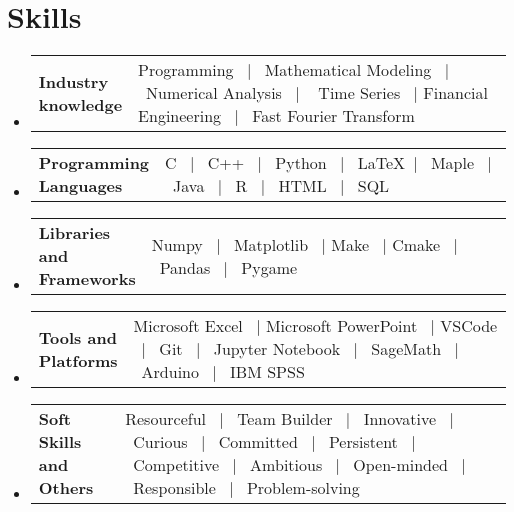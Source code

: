 \documentclass[a4paper,11pt,dvipsnames]{article}
\makeatletter
\newcommand{\resumeSectionTypeOne}[2]{
	\item\begin{tabular*}{0.99\textwidth}[t]{
			p{0.18\linewidth}p{0.81\linewidth}
		}
		\textbf{#1} & #2
	\end{tabular*}\vspace{-2pt}
}
\newcommand{\resumeQuadHeading}[4]{
	\item
	\begin{tabular*}{0.96\textwidth}[t]{l@{\extracolsep{\fill}}r}
		\textbf{#1} & \small #2 \\
		\small#3 & \small #4 \\
	\end{tabular*}
}
\newcommand{\resumeHeadingListStart}{
	\begin{itemize}[leftmargin=0.15in, label={}]
	}
\newcommand{\resumeHeadingListEnd}{\end{itemize}}
\makeatother
\begin{document}
	
	
	
	
	
	\section{Skills}
	\resumeHeadingListStart{}
	\resumeSectionTypeOne{Industry\hspace{1cm} knowledge}{Programming \ $|$ \ Mathematical Modeling \ $|$ \ Numerical Analysis \ $|$ \ \hspace{2cm} Time Series \ $|$ Financial Engineering \ $|$ \ Fast Fourier Transform}
	\resumeHeadingListEnd{}
	
	\resumeHeadingListStart{}
	\resumeSectionTypeOne{Programming Languages}{C \ $|$ \ C++ \ $|$ \ Python \ $|$ \ \LaTeX \ $|$ \ Maple \ $|$ \ Java \ $|$ \ R \ $|$ \ HTML \ $|$ \ SQL}
	\resumeHeadingListEnd{}
	
	\resumeHeadingListStart{}
	\resumeSectionTypeOne{Libraries and Frameworks}{Numpy \ $|$ \ Matplotlib \ $|$ Make \ $|$ Cmake \ $|$  \ Pandas \ $|$  \ Pygame}
	\resumeHeadingListEnd{}
	
	\resumeHeadingListStart{}
	\resumeSectionTypeOne{Tools and\hspace{0.5cm} Platforms}{Microsoft Excel \ $|$ Microsoft PowerPoint \ $|$ VSCode \ $|$ \ Git  \ $|$ \ Jupyter Notebook \ $|$ \ SageMath \ $|$ \ Arduino \ $|$ \ IBM SPSS}
	\resumeHeadingListEnd{}
	
	\resumeHeadingListStart{}
	\resumeSectionTypeOne{Soft Skills and Others}{Resourceful \ $|$ \ Team Builder \ $|$ \ Innovative \ $|$ \ Curious \ $|$ \ Committed \ $|$ \ Persistent \ $|$ \ Competitive \ $|$ \ Ambitious \ $|$ \ Open-minded \ $|$ \ Responsible \ $|$ \ Problem-solving}
	\resumeHeadingListEnd{}
	
\end{document}
